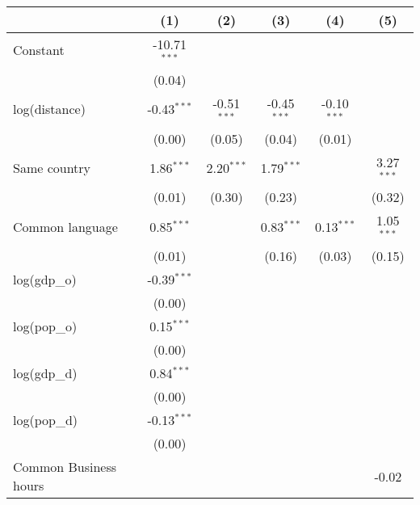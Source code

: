 
\begingroup
\centering
\small
\begin{tabular}{lccccc}
   \toprule
                            & (1)            & (2)           & (3)           & (4)           & (5)\\  
   \midrule 
   Constant                 & -10.71$^{***}$ &               &               &               &   \\   
                            & (0.04)         &               &               &               &   \\   
   log(distance)            & -0.43$^{***}$  & -0.51$^{***}$ & -0.45$^{***}$ & -0.10$^{***}$ &   \\   
                            & (0.00)         & (0.05)        & (0.04)        & (0.01)        &   \\   
   Same country             & 1.86$^{***}$   & 2.20$^{***}$  & 1.79$^{***}$  &               & 3.27$^{***}$\\   
                            & (0.01)         & (0.30)        & (0.23)        &               & (0.32)\\   
   Common language          & 0.85$^{***}$   &               & 0.83$^{***}$  & 0.13$^{***}$  & 1.05$^{***}$\\   
                            & (0.01)         &               & (0.16)        & (0.03)        & (0.15)\\   
   log(gdp\_o)              & -0.39$^{***}$  &               &               &               &   \\   
                            & (0.00)         &               &               &               &   \\   
   log(pop\_o)              & 0.15$^{***}$   &               &               &               &   \\   
                            & (0.00)         &               &               &               &   \\   
   log(gdp\_d)              & 0.84$^{***}$   &               &               &               &   \\   
                            & (0.00)         &               &               &               &   \\   
   log(pop\_d)              & -0.13$^{***}$  &               &               &               &   \\   
                            & (0.00)         &               &               &               &   \\   
   Common Business hours    &                &               &               &               & -0.02\\   

\end{tabular}

